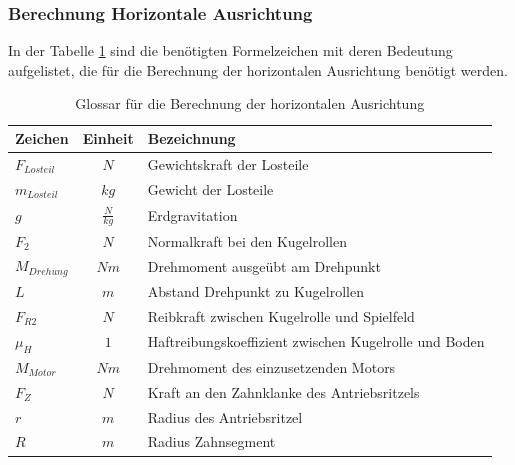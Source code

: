 \subsubsection{Berechnung Horizontale Ausrichtung}
In der Tabelle \ref{tab:glossarHorizontaleAusrichtung} sind die benötigten
Formelzeichen mit deren Bedeutung aufgelistet, die für die Berechnung der horizontalen
Ausrichtung benötigt werden.
\begin{table}[h!]
    \begin{tabular}{lcl}
        \rule{0pt}{11pt}Zeichen & Einheit & Bezeichnung \\
        \hline\rule{0pt}{11pt}$F_{Losteil}$ & $N$ & Gewichtskraft der Losteile \\
        \rule{0pt}{11pt}$m_{Losteil}$ & $kg$ & Gewicht der Losteile \\
        \rule{0pt}{11pt}$g$ & $\frac{N}{kg}$ & Erdgravitation \\
        \rule{0pt}{11pt}$F_2$ & $N$ & Normalkraft bei den Kugelrollen \\
        \rule{0pt}{11pt}$M_{Drehung}$ & $Nm$ & Drehmoment ausgeübt am Drehpunkt \\
        \rule{0pt}{11pt}$L$ & $m$ & Abstand Drehpunkt zu Kugelrollen \\
        \rule{0pt}{11pt}$F_{R2}$ & $N$ & Reibkraft zwischen Kugelrolle und Spielfeld \\
        \rule{0pt}{11pt}$\mu_H$ & $1$ & Haftreibungskoeffizient zwischen Kugelrolle und Boden \\
        \rule{0pt}{11pt}$M_{Motor}$ & $Nm$ & Drehmoment des einzusetzenden Motors \\
        \rule{0pt}{11pt}$F_Z$ & $N$ & Kraft an den Zahnklanke des Antriebsritzels \\
        \rule{0pt}{11pt}$r$ & $m$ & Radius des Antriebsritzel \\
        \rule{0pt}{11pt}$R$ & $m$ & Radius Zahnsegment \\
    \end{tabular}
    	\centering
    	\caption{Glossar für die Berechnung der horizontalen Ausrichtung}
    	\label{tab:glossarHorizontaleAusrichtung}
\end{table}
\newpage

